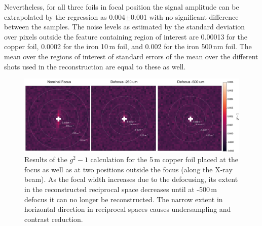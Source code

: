 Nevertheless, for all three foils in focal position the signal amplitude can be extrapolated by the regression as 0.004$\pm$0.001 with no significant difference between the samples.
The noise levels as estimated by the standard deviation over pixels outside the feature containing region of interest are  0.00013 for the copper foil, 0.0002 for the iron 10\,\textmu m foil, and 0.002 for the iron 500\,nm foil. The mean over the regions of interest of standard errors of the mean over the different shots used in the reconstruction are equal to these as well.

\begin{figure}
	\centering
	\includegraphics[width=0.95\linewidth]{images/Cu5um_reco2d.pdf}
	\caption[Results copper foil]{Results of the $g^2-1$ calculation for the 5\,\textmu m copper foil placed at the focus as well as at two positions outside the focus (along the X-ray beam). As the focal width increases due to the defocusing, its extent in the reconstructed reciprocal space decreases until at -500\,\textmu m defocus it can no longer be reconstructed. The narrow extent in horizontal direction in reciprocal spaces causes undersampling and contrast reduction. }
	\label{fig:Cu5umreco2d}
\end{figure}
